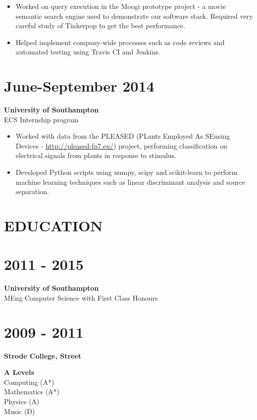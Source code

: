 \documentclass[margin]{res}
\begin{document}
\begin{resume}
\begin{itemize}
\item
Worked on query execution in the Moogi prototype project - a movie semantic search engine used to demonstrate our software stack. Required very careful study of Tinkerpop to get the best performance.

\item
Helped implement company-wide processes such as code reviews and automated testing using Travis CI and Jenkins.

\end{itemize}

\normalsize{\section{June-September 2014}}
{\bf University of Southampton} \\
ECS Internship program \\
\begin{itemize}
\item
Worked with data from the PLEASED
(PLants Employed As SEnsing Devices - \href{http://pleased-fp7.eu/}{http://pleased-fp7.eu/}) project, performing classification on electrical signals from plants in response to stimulus.
\item
Developed Python scripts using numpy, scipy and scikit-learn to perform machine learning techniques such as linear discriminant analysis and source separation.
\end{itemize}

\section{EDUCATION}
\normalsize{\section{2011 - 2015}}
{\bf University of Southampton} \\
MEng Computer Science with First Class Honours \\
\normalsize{\section{2009 - 2011}}
{\bf Strode College, Street}

{\bf A Levels} \\
Computing (A*) \\
Mathematics (A*) \\
Physics (A) \\
Music (D)


\end{resume}
\end{document}
